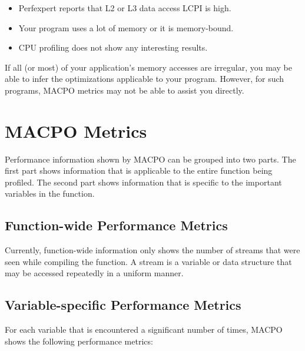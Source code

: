 \begin{itemize}
	\item Perfexpert reports that L2 or L3 data access LCPI is high.
	\item Your program uses a lot of memory or it is memory-bound.
	\item CPU profiling does not show any interesting results.
\end{itemize}

If all (or most) of your application's memory accesses are irregular, you may be able to infer the optimizations applicable to your program. However, for such programs, MACPO metrics may not be able to assist you directly.

\section{MACPO Metrics}
\label{sec:macpo-metrics}

Performance information shown by MACPO can be grouped into two parts. The first part shows information that is applicable to the entire function being profiled. The second part shows information that is specific to the important variables in the function.

\subsection{Function-wide Performance Metrics}
Currently, function-wide information only shows the number of streams that were seen while compiling the function. A stream is a variable or data structure that may be accessed repeatedly in a uniform manner.

\subsection{Variable-specific Performance Metrics}
For each variable that is encountered a significant number of times, MACPO shows the following performance metrics:

